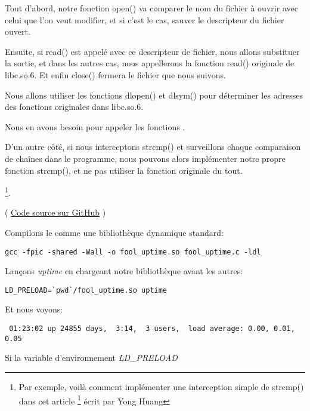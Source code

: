Tout d'abord, notre fonction open() va comparer le nom du fichier à ouvrir avec celui que l'on veut modifier,
et si c'est le cas, sauver le descripteur du fichier ouvert.

Ensuite, si read() est appelé avec ce descripteur de fichier, nous allons substituer la sortie,
et dans les autres cas, nous appellerons la fonction read() originale de libc.so.6.
Et enfin close() fermera le fichier que nous suivons.


Nous allons utiliser les fonctions dlopen() et dlsym() pour déterminer les adresses des fonctions originales dans libc.so.6.

Nous en avons besoin pour appeler les fonctions .


D'un autre côté, si nous interceptons strcmp() et surveillons chaque comparaison de
chaînes dans le programme, nous pouvons alors implémenter notre propre fonction strcmp(),
et ne pas utiliser la fonction originale du tout.

\footnote{Par exemple, voilà comment implémenter une interception simple de strcmp() dans cet article
\footnote{\href{http://go.yurichev.com/17143}{yurichev.com}}
écrit par Yong Huang}.


( \href{\GitHubBlobMasterURL/OS/LD_PRELOAD/fool_uptime.c}{Code source sur GitHub} )

Compilons le comme une bibliothèque dynamique standard:

\begin{lstlisting}
gcc -fpic -shared -Wall -o fool_uptime.so fool_uptime.c -ldl
\end{lstlisting}

Lançons \emph{uptime}
en chargeant notre bibliothèque avant les autres:

\begin{lstlisting}
LD_PRELOAD=`pwd`/fool_uptime.so uptime
\end{lstlisting}

Et nous voyons:

\begin{lstlisting}
 01:23:02 up 24855 days,  3:14,  3 users,  load average: 0.00, 0.01, 0.05
\end{lstlisting}

Si la variable d'environnement \emph{LD\_PRELOAD}

